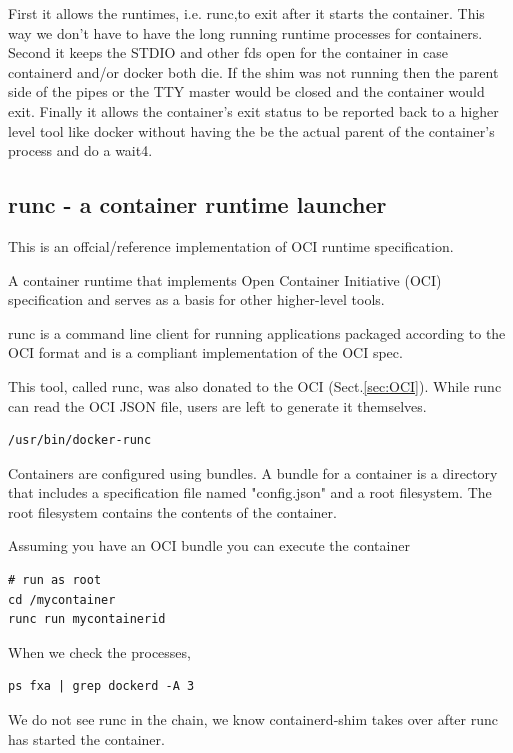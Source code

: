 First it allows the runtimes, i.e. runc,to exit after it starts the container.
This way we don't have to have the long running runtime processes for
containers.
Second it keeps the STDIO and other fds open for the container in case
containerd and/or docker both die. If the shim was not running then the parent
side of the pipes or the TTY master would be closed and the container would
exit.
Finally it allows the container's exit status to be reported back to a higher
level tool like docker without having the be the actual parent of the
container's process and do a wait4.



\subsection{runc - a container runtime launcher}
\label{sec:runC-utility}

This is an offcial/reference implementation of OCI runtime specification.

A container runtime that implements Open Container Initiative (OCI)
specification and serves as a basis for other higher-level tools.

runc is a command line client for running applications packaged according to 
the OCI format and is a compliant implementation of the OCI spec.

This tool, called runc, was also donated to the OCI (Sect.\ref{sec:OCI}).
While runc can read the OCI JSON file, users are left to generate it themselves.


\begin{verbatim}
/usr/bin/docker-runc
\end{verbatim}


Containers are configured using bundles. A bundle for a container is a directory 
that includes a specification file named "config.json" and a root filesystem. 
The root filesystem contains the contents of the container.

Assuming you have an OCI bundle you can execute the container


\begin{verbatim}
# run as root
cd /mycontainer  
runc run mycontainerid  
\end{verbatim}

When we check the processes,
\begin{verbatim}
ps fxa | grep dockerd -A 3  
\end{verbatim}
We do not see runc in the chain, we know containerd-shim takes over after runc has started the container. 

